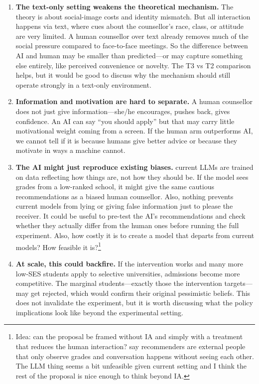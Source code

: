 \documentclass[11pt,a4paper]{article}
\begin{document}
\begin{enumerate}[leftmargin=*, itemsep=6pt]

\item \textbf{The text-only setting weakens the theoretical mechanism.} The theory is about social-image costs and identity mismatch. But all interaction happens via text, where cues about the counsellor's race, class, or attitude are very limited. A human counsellor over text already removes much of the social pressure compared to face-to-face meetings. So the difference between AI and human may be smaller than predicted---or may capture something else entirely, like perceived convenience or novelty. The T3 vs T2 comparison helps, but it would be good to discuss why the mechanism should still operate strongly in a text-only environment. 

\item \textbf{Information and motivation are hard to separate.} A human counsellor does not just give information---she/he encourages, pushes back, gives confidence. An AI can say ``you should apply'' but that may carry little motivational weight coming from a screen. If the human arm outperforms AI, we cannot tell if it is because humans give better advice or because they motivate in ways a machine cannot. 

\item \textbf{The AI might just reproduce existing biases.} current LLMs are trained on data reflecting how things are, not how they should be. If the model sees grades from a low-ranked school, it might give the same cautious recommendations as a biased human counsellor. Also, nothing prevents current models from lying or giving false information just to please the receiver. It could be useful to pre-test the AI's recommendations and check whether they actually differ from the human ones before running the full experiment. Also, how costly it is to create a model that departs from current models? How feasible it is?\footnote{Idea: can the proposal be framed without IA and simply with a treatment that reduces the human interaction? say recommenders are external people that only observe grades and conversation happens without seeing each other. The LLM thing seems a bit unfeasible given current setting and I think the rest of the proposal is nice enough to think beyond IA.}

\item \textbf{At scale, this could backfire.} If the intervention works and many more low-SES students apply to selective universities, admissions become more competitive. The marginal students---exactly those the intervention targets---may get rejected, which would confirm their original pessimistic beliefs. This does not invalidate the experiment, but it is worth discussing what the policy implications look like beyond the experimental setting.

\end{enumerate}
\end{document}
